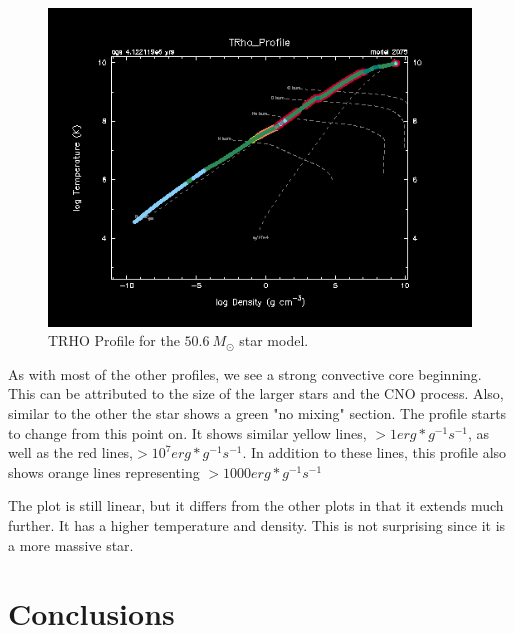 \documentclass[fleqn,usenatbib]{mnras}
\begin{document}
\begin{figure}
    \centering
    \includegraphics[width=\columnwidth]{50.6 Trho.png}
    \caption{TRHO Profile for the \(50.6\ M_\odot\) star model.}
    \label{fig:50.6_Msol_trho_figure}
\end{figure}



\par As with most of the other profiles, we see a strong convective core beginning.  This can be attributed to the size of the larger stars and the CNO process.  Also, similar to the other the star shows a green "no mixing" section.  The profile starts to change from this point on.  It shows similar yellow lines, $ > 1 erg* g^{-1}s^{-1}$, as well as the red lines,$ > 10^{7} erg* g^{-1}s^{-1}$.  In addition to these lines, this profile also shows orange lines representing $ > 1000 erg* g^{-1}s^{-1}$
\par The plot is still linear, but it differs from the other plots in that it extends much further.  It has a higher temperature and density. This is not surprising since it is a more massive star.
\section{Conclusions}
\end{document}
